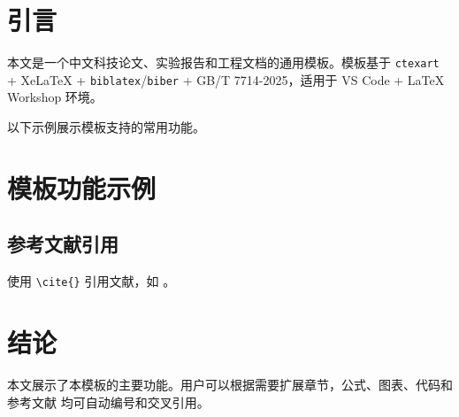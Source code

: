 \section{引言}

本文是一个中文科技论文、实验报告和工程文档的通用模板。模板基于 \texttt{ctexart} +
XeLaTeX + \texttt{biblatex}/\texttt{biber} + GB/T 7714-2025，适用于 VS Code + LaTeX
Workshop 环境。

以下示例展示模板支持的常用功能。

\section{模板功能示例}







\subsection{参考文献引用}

使用 \verb|\cite{}| 引用文献，如 \cite{latex-intro,vscode-latex,example-article}。

\section{结论}

本文展示了本模板的主要功能。用户可以根据需要扩展章节，公式、图表、代码和参考文献
均可自动编号和交叉引用。
